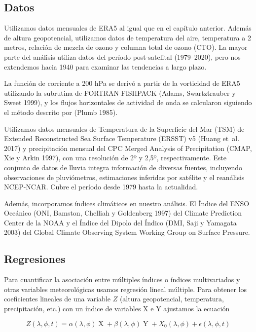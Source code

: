 \documentclass[12pt,oneside,a4paper]{reedthesis}
\begin{document}
\hypertarget{datos-2}{%
\subsection{Datos}\label{datos-2}}

Utilizamos datos mensuales de ERA5 al igual que en el capítulo anterior.
Además de altura geopotencial, utilizamos datos de temperatura del aire, temperatura a 2 metros, relación de mezcla de ozono y columna total de ozono (CTO).
La mayor parte del análisis utiliza datos del período post-satelital (1979--2020), pero nos extendemos hacia 1940 para examinar las tendencias a largo plazo.

La función de corriente a 200 hPa se derivó a partir de la vorticidad de ERA5 utilizando la subrutina de FORTRAN FISHPACK (Adams, Swartztrauber y Sweet 1999), y los flujos horizontales de actividad de onda se calcularon siguiendo el método descrito por (Plumb 1985).

Utilizamos datos mensuales de Temperatura de la Superficie del Mar (TSM) de Extended Reconstructed Sea Surface Temperature (ERSST) v5 (Huang et~al. 2017) y precipitación mensual del CPC Merged Analysis of Precipitation (CMAP, Xie y Arkin 1997), con una resolución de 2º y 2,5º, respectivamente.
Este conjunto de datos de lluvia integra información de diversas fuentes, incluyendo observaciones de pluviómetros, estimaciones inferidas por satélite y el reanálisis NCEP-NCAR.
Cubre el período desde 1979 hasta la actualidad.

Además, incorporamos índices climáticos en nuestro análisis.
El Índice del ENSO Oceánico (ONI, Bamston, Chelliah y Goldenberg 1997) del Climate Prediction Center de la NOAA y el Índice del Dipolo del Índico (DMI, Saji y Yamagata 2003) del Global Climate Observing System Working Group on Surface Pressure.

\hypertarget{regresiones-1}{%
\subsection{Regresiones}\label{regresiones-1}}

Para cuantificar la asociación entre múltiples índices o índices multivariados y otras variables meteorológicas usamos regresión lineal múltiple.
Para obtener los coeficientes lineales de una variable \(Z\) (altura geopotencial, temperatura, precipitación, etc.) con un índice de variables X e Y ajustamos la ecuación

\begin{equation}
Z(\lambda, \phi, t) = \alpha(\lambda, \phi) \operatorname{X} + \beta(\lambda, \phi) \operatorname{Y} + X_0(\lambda, \phi) + \epsilon(\lambda, \phi, t)
\label{eq:multiple-regression-sam}
\end{equation}
\end{document}
